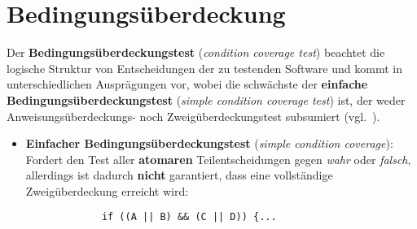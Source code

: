 \section{Bedingungsüberdeckung}

\begin{tcolorbox}[title=Bedingungsüberdeckung]

    Der \textbf{Bedingungsüberdeckungstest} (\textit{condition coverage test}) beachtet die logische Struktur von Entscheidungen der zu testenden Software und kommt in unterschiedlichen Ausprägungen vor, wobei die schwächste der \textbf{einfache Bedingungsüberdeckungstest} (\textit{simple condition coverage test}) ist, der weder Anweisungsüberdeckungs- noch Zweigüberdeckungstest subsumiert (vgl.~\cite[93]{Lig09a}).

    \begin{itemize}
        \item \textbf{Einfacher Bedingungsüberdeckungstest} (\textit{simple condition coverage}): Fordert den Test aller \textbf{atomaren} Teilentscheidungen gegen \textit{wahr} oder \textit{falsch}, allerdings ist dadurch \textbf{nicht} garantiert, dass eine vollständige Zweigüberdeckung erreicht wird:

         \begin{verbatim}
             if ((A || B) && (C || D)) {...
         \end{verbatim}


\end{itemize}
\end{tcolorbox}
